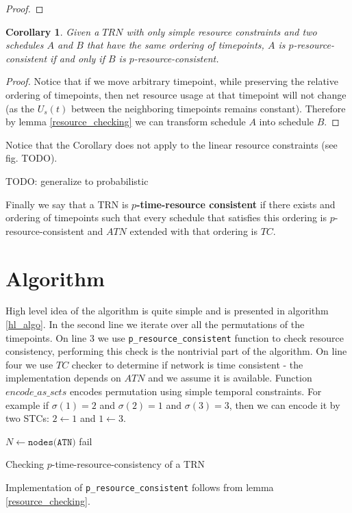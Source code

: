 \documentclass{article}
\newtheorem{corollary}{Corollary}[theorem]
\begin{document}
\begin{multicols}{2}
\begin{proof}
\end{proof}
\begin{corollary}
Given a $TRN$ with only simple resource constraints and two schedules $A$ and $B$ that have the same ordering of timepoints, $A$ is $p$-resource-consistent if and only if $B$ is $p$-resource-consistent.
\end{corollary}
\begin{proof}
Notice that if we move arbitrary timepoint, while preserving the relative ordering of timepoints, then net resource usage at that timepoint will not change (as the $U_s(t)$ between the neighboring timepoints remains constant). Therefore by lemma \ref{resource_checking} we can transform schedule $A$ into schedule $B$.
\end{proof}
Notice that the Corollary does not apply to the linear resource constraints (see fig. TODO).

TODO: generalize to probabilistic

Finally we say that a TRN is \textbf{$p$-time-resource consistent} if there exists and ordering of timepoints such that every schedule that satisfies this ordering is $p$-resource-consistent and $ATN$ extended with that ordering is $TC$.

\section{Algorithm}
High level idea of the algorithm is quite simple and is presented in algorithm \ref{hl_algo}. In the second line we iterate over all the permutations of the timepoints. On line 3 we use \texttt{p\_resource\_consistent} function to check resource consistency, performing this check is the nontrivial part of the algorithm. On line four we use $TC$ checker to determine if network is time consistent - the implementation depends on $ATN$ and we assume it is available. Function $encode\_as\_scts$ encodes permutation using simple temporal constraints. For example if $\sigma(1) = 2$ and $\sigma(2) = 1$ and $\sigma(3) = 3$, then we can encode it by two STCs: $ 2 \leftarrow 1 $ and $1 \leftarrow 3$.

\begin{algorithm}[H]
    \label{hl_algo}
    $N \leftarrow \texttt{nodes(ATN)}$\;
    fail\;
    \caption{Checking $p$-time-resource-consistency of a TRN }
\end{algorithm}
Implementation of \texttt{p\_resource\_consistent} follows from lemma \ref{resource_checking}.




\end{multicols}
\end{document}
